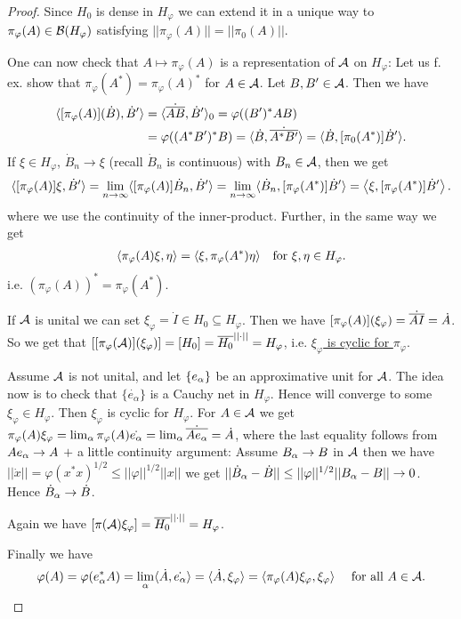 \documentclass[10pt,english,a4paper]{article}
\theoremstyle{definition}
\def\dA{\dot{A}}
\def\dB{\dot{B}}
\def\eal{e_{\alpha}}
\def\dA{\dot{A}}
\def\dB{\dot{B}}
\def\vphi{\varphi}
\begin{document}
\begin{proof}
Since $H_0$
is dense in $H_{\vphi}$ we can extend it in a unique way to $\pi_{\vphi}(A) \in \Bs(H_{\vphi})$
satisfying $||\pi_{\vphi}(A)|| = ||\pi_0(A)||$.

One can now check that $A \mapsto \pi_{\vphi} (A)$ is a representation of $\mathcal{A}$
on $H_{\vphi}$:
Let us f. ex. show that $\pi_{\vphi}(A^*) = \pi_{\vphi}(A)^*$ for $A \in \mathcal{A}$.
Let $B,B' \in \mathcal{A}$. Then we have 
\begin{align*}
    \indi{[\pi_{\vphi}(A)](\dB), \dB'} &= \indi{\dot{\ol{AB}},\dB'}_0 =
\vphi((B')^*AB) \\
&= \vphi((A^*B')^*B) = \indi{\dB, \dot{\ol{A^*B'}}} = \indi{\dB, [\pi_0(A^*)]\dB'}.
\end{align*}
If $\xi \in H_{\vphi}$, $\dB_n \to \xi$ (recall $\dB_n$ is continuous) with $B_n \in \mathcal{A}$,
then we get 
\begin{align*}
    \indi{[\pi_{\vphi}(A)]\xi,\dB'} = \lim_{n\to\infty} \indi{[\pi_{\vphi}(A)]\dB_n, \dB'}
= \lim_{n\to\infty} \indi{\dB_n, [\pi_{\vphi}(A^*)]\dB'} = \ind{\xi,[\pi_{\vphi}(A^*)]\dB'}.
\end{align*}
where we use the continuity of the inner-product. Further, in the same way we get
\begin{align*}
    \indi{\pi_{\vphi}(A)\xi,\eta} = \indi{\xi, \pi_{\vphi}(A^*)\eta} \quad \text{for }
\xi,\eta\in H_{\vphi}.
\end{align*}
i.e. \ul{$(\pi_{\vphi}(A))^* = \pi_{\vphi}(A^*)$}.

If $\mathcal{A}$ is unital we can set $\xi_{\vphi} = \dot{I} \in H_0 \subseteq
H_{\vphi}$.  Then we have $[\pi_{\vphi}(A)](\xi_{\vphi}) = \dot{\ol{AI}} =
\dA$.  So we get that $\left[[\pi_{\vphi}(\As)](\xi_{\vphi})\right]  = [H_0] =
\ol{H_0}^{||\cdot||} = H_{\vphi}$, i.e. \ul{$\xi_{\vphi}$ is cyclic for
$\pi_{\vphi}$}.

Assume $\mathcal{A}$ is not unital, and let $\{e_{\alpha}\}$ be an approximative unit for $\mathcal{A}$.
The idea now is to check that $\{\dot{\eal}\}$ is a Cauchy net in $H_{\vphi}$.
Hence will converge to some $\xi_{\vphi} \in H_{\vphi}$. Then $\xi_{\vphi}$ is cyclic 
for $H_{\vphi}$.
For $A \in \mathcal{A}$ we get $\pi_{\vphi}(A)\xi_{\vphi} = \lim_{\al} \pi_{\vphi}(A)\dot{\eal} = 
\lim_{\al} \dot{\ol{Ae_{\al}}} = \dA$,
where the last equality follows from $Ae_{\alpha}\to A$ $+$ a little
continuity argument: Assume $B_{\alpha}\to B$ in $\mathcal{A}$ then we have 
$||\dot{x}|| = \vphi(x^*x)^{1/2} \leq ||\vphi||^{1/2}||x||$ we get 
$||\dB_{\al} - \dB|| \leq ||\vphi||^{1/2} ||B_{\al} - B|| \to 0$. Hence 
$\dB_{\al}\to \dB$.

Again we have $[\pi(\As)\xi_{\vphi}] = \ol{H_0}^{||\cdot||} = H_{\vphi}$.

Finally we have
\begin{align*}
    \vphi(A) = \vphi(e^{*}_{\al}A) = \lim_{\al} \indi{\dA,\dot{\eal}} = \indi{\dA, \xi_{\vphi}}
= \indi{\pi_{\vphi}(A)\xi_{\vphi},\xi_{\vphi}} \quad\text{ for all }A \in \As.
\end{align*}

\end{proof}
\end{document}
